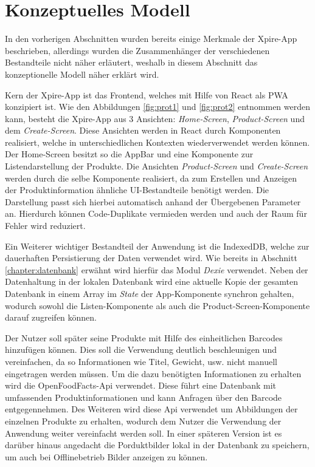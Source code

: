 \section{Konzeptuelles Modell}

In den vorherigen Abschnitten wurden bereits einige Merkmale der Xpire-App beschrieben, allerdings wurden die Zusammenhänger der verschiedenen Bestandteile nicht näher erläutert, weshalb in diesem Abschnitt das konzeptionelle Modell näher erklärt wird. 

Kern der Xpire-App ist das Frontend, welches mit Hilfe von React als PWA konzipiert ist. Wie den Abbildungen \ref{fig:prot1} und \ref{fig:prot2} entnommen werden kann, besteht die Xpire-App aus 3 Ansichten: \textit{Home-Screen}, \textit{Product-Screen} und dem \textit{Create-Screen}. Diese Ansichten werden in React durch Komponenten realisiert, welche in unterschiedlichen Kontexten wiederverwendet werden können. Der Home-Screen besitzt so die AppBar und eine Komponente zur Listendarstellung der Produkte. Die Ansichten \textit{Product-Screen} und \textit{Create-Screen} werden durch die selbe Komponente realisiert, da zum Erstellen und Anzeigen der Produktinformation ähnliche UI-Bestandteile benötigt werden. Die Darstellung passt sich hierbei automatisch anhand der Übergebenen Parameter an. Hierdurch können Code-Duplikate vermieden werden und auch der Raum für Fehler wird reduziert. 

Ein Weiterer wichtiger Bestandteil der Anwendung ist die IndexedDB, welche zur dauerhaften Persistierung der Daten verwendet wird. Wie bereits in Abschnitt \ref{chapter:datenbank} erwähnt wird hierfür das Modul \textit{Dexie} verwendet. Neben der Datenhaltung in der lokalen Datenbank wird eine aktuelle Kopie der gesamten Datenbank in einem Array im \textit{State} der App-Komponente synchron gehalten, wodurch sowohl die Listen-Komponente als auch die Product-Screen-Komponente darauf zugreifen können.

Der Nutzer soll später seine Produkte mit Hilfe des einheitlichen Barcodes hinzufügen können. Dies soll die Verwendung deutlich beschleunigen und vereinfachen, da so Informationen wie Titel, Gewicht, usw. nicht manuell eingetragen werden müssen. Um die dazu benötigten Informationen zu erhalten wird die OpenFoodFacts-Api verwendet. Diese führt eine Datenbank mit umfassenden Produktinformationen und kann Anfragen über den Barcode entgegennehmen. Des Weiteren wird diese Api verwendet um Abbildungen der einzelnen Produkte zu erhalten, wodurch dem Nutzer die Verwendung der Anwendung weiter vereinfacht werden soll. In einer späteren Version ist es darüber hinaus angedacht die Porduktbilder lokal in der Datenbank zu speichern, um auch bei Offlinebetrieb Bilder anzeigen zu können.